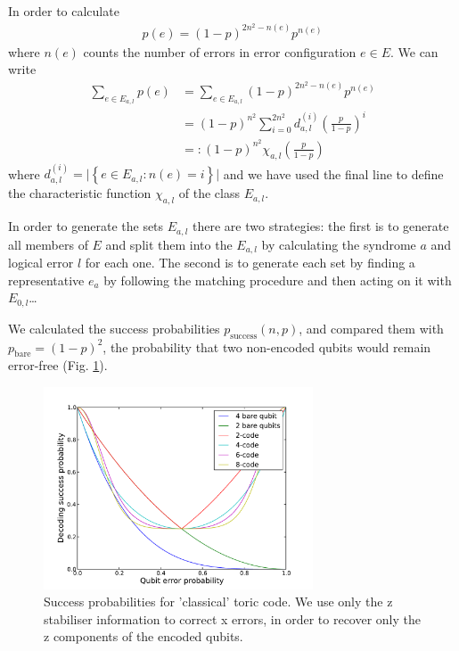 In order to calculate
\begin{align}
  p(e) = (1-p)^{2n^2 - n(e)} p^{n(e)}
\end{align}
where $n(e)$ counts the number of errors in error configuration $e \in E$. We can write
\begin{align}
  \sum_{e \in E_{a,l}} p(e) &= \sum_{e \in E_{a,l}} (1-p)^{2n^2 - n(e)} p^{n(e)} \\
  &= (1-p)^{n^2} \sum_{i = 0}^{2n^2} d_{a,l}^{(i)} \left(\frac{p}{1-p}\right)^i \\
  &=: (1-p)^{n^2} \chi_{a,l}\left(\frac{p}{1-p}\right)
\end{align}
where $d_{a,l}^{(i)} = \vert \left\{e \in E_{a,l} : n(e)=i \right\} \vert$ and we have used the final line to define the characteristic function $\chi_{a,l}$ of the class $E_{a,l}$.

In order to generate the sets $E_{a,l}$ there are two strategies: the first is to generate all members of $E$ and split them into the $E_{a,l}$ by calculating the syndrome $a$ and logical error $l$ for each one. The second is to generate each set by finding a representative $e_{a}$ by following the matching procedure and then acting on it with $E_{0, l}$\ldots 

We calculated the success probabilities $p_{\text{success}}(n, p)$, and compared them with $p_{\text{bare}} = (1-p)^2$, the probability that two non-encoded qubits would remain error-free (Fig. \ref{x_truthful}).

\begin{figure}[htb]
  \begin{center}
    \includegraphics[width=8cm]{assets/x_truthful.pdf}
  \end{center}
  \caption{Success probabilities for 'classical' toric code. We use only the z stabiliser information to correct x errors, in order to recover only the z components of the encoded qubits.}
  \label{x_truthful}
\end{figure}

